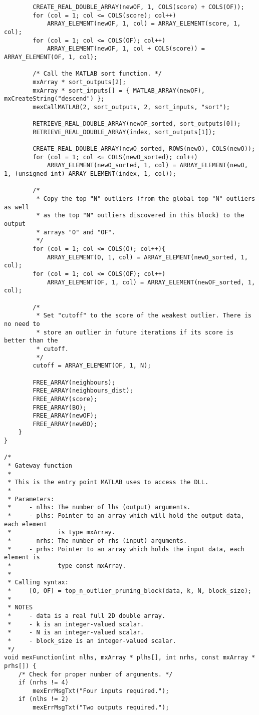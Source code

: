 \begin{lstlisting}
        CREATE_REAL_DOUBLE_ARRAY(newOF, 1, COLS(score) + COLS(OF));
        for (col = 1; col <= COLS(score); col++)
            ARRAY_ELEMENT(newOF, 1, col) = ARRAY_ELEMENT(score, 1, col);
        for (col = 1; col <= COLS(OF); col++)
            ARRAY_ELEMENT(newOF, 1, col + COLS(score)) = ARRAY_ELEMENT(OF, 1, col);
        
        /* Call the MATLAB sort function. */
        mxArray * sort_outputs[2];
        mxArray * sort_inputs[] = { MATLAB_ARRAY(newOF), mxCreateString("descend") };
        mexCallMATLAB(2, sort_outputs, 2, sort_inputs, "sort");

		RETRIEVE_REAL_DOUBLE_ARRAY(newOF_sorted, sort_outputs[0]);
		RETRIEVE_REAL_DOUBLE_ARRAY(index, sort_outputs[1]);

        CREATE_REAL_DOUBLE_ARRAY(newO_sorted, ROWS(newO), COLS(newO));
        for (col = 1; col <= COLS(newO_sorted); col++)
            ARRAY_ELEMENT(newO_sorted, 1, col) = ARRAY_ELEMENT(newO, 1, (unsigned int) ARRAY_ELEMENT(index, 1, col));

		/*
		 * Copy the top "N" outliers (from the global top "N" outliers as well 
		 * as the top "N" outliers discovered in this block) to the output 
		 * arrays "O" and "OF".
		 */
        for (col = 1; col <= COLS(O); col++){
            ARRAY_ELEMENT(O, 1, col) = ARRAY_ELEMENT(newO_sorted, 1, col);
        for (col = 1; col <= COLS(OF); col++)
            ARRAY_ELEMENT(OF, 1, col) = ARRAY_ELEMENT(newOF_sorted, 1, col);

        /*
         * Set "cutoff" to the score of the weakest outlier. There is no need to
         * store an outlier in future iterations if its score is better than the
         * cutoff.
         */
        cutoff = ARRAY_ELEMENT(OF, 1, N);
        
        FREE_ARRAY(neighbours);
        FREE_ARRAY(neighbours_dist);
        FREE_ARRAY(score);
        FREE_ARRAY(BO);
        FREE_ARRAY(newOF);
        FREE_ARRAY(newBO);
    }
}
 
/*
 * Gateway function
 *
 * This is the entry point MATLAB uses to access the DLL.
 *
 * Parameters:
 *     - nlhs: The number of lhs (output) arguments.
 *     - plhs: Pointer to an array which will hold the output data, each element
 *             is type mxArray.
 *     - nrhs: The number of rhs (input) arguments.
 *     - prhs: Pointer to an array which holds the input data, each element is
 *             type const mxArray.
 *
 * Calling syntax:
 *     [O, OF] = top_n_outlier_pruning_block(data, k, N, block_size);
 *
 * NOTES
 *     - data is a real full 2D double array.
 *     - k is an integer-valued scalar.
 *     - N is an integer-valued scalar.
 *     - block_size is an integer-valued scalar.
 */
void mexFunction(int nlhs, mxArray * plhs[], int nrhs, const mxArray * prhs[]) {
    /* Check for proper number of arguments. */
    if (nrhs != 4)
        mexErrMsgTxt("Four inputs required.");
    if (nlhs != 2)
        mexErrMsgTxt("Two outputs required.");


\end{lstlisting}

